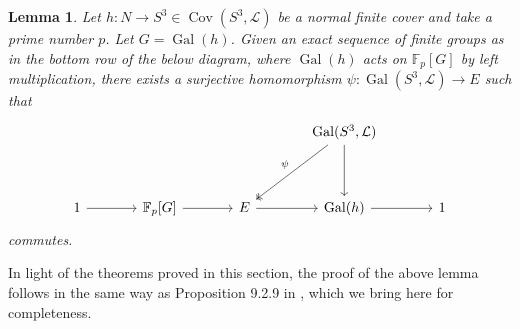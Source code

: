 \documentclass{amsart}
\theoremstyle{plain}
\theoremstyle{definition}
\theoremstyle{plain}
\theoremstyle{plain}
\theoremstyle{plain}
\newtheorem{lemma}[theorem]{Lemma}
\theoremstyle{remark}
\theoremstyle{remark}
\theoremstyle{plain}
\theoremstyle{definition}
\theoremstyle{plain}
\DeclareMathOperator{\Gal}{\mathrm{Gal}}
\DeclareMathOperator{\Cov}{\mathrm{Cov}}
\theoremstyle{plain}
\theoremstyle{plain}
\numberwithin{equation}{section}
\begin{document}
\begin{lemma}\label{lma:embdding}
Let $h: N \to S^3 \in \Cov(S^3, \mathcal{L})$ be a normal finite cover and take a prime number $p$. Let $G = \Gal(h)$. Given an exact sequence of finite groups as in the bottom row of the below diagram, where $\Gal(h)$ acts on $\mathbb F_p[G]$ by left multiplication, there exists a surjective homomorphism $\psi: \Gal(S^3, \mathcal{L}) \to E$ such that 
\[
\begin{tikzcd}[column sep=large, row sep=large]
& & & \mathrm{Gal}(S^3, \mathcal{L}) \arrow[d] \arrow[dl, two heads, "\psi"'] \\[1em]
1 \arrow[r] 
& \mathbb{F}_p[G] \arrow[r] 
& E \arrow[r] 
& \Gal(h) \arrow[r]
& 1
\end{tikzcd}
\]
commutes. 
\end{lemma}
In light of the theorems proved in this section, the proof of the above lemma follows in the same way as Proposition 9.2.9 in \cite{neukirch2013cohomology}, which we bring here for completeness.
\end{document}
